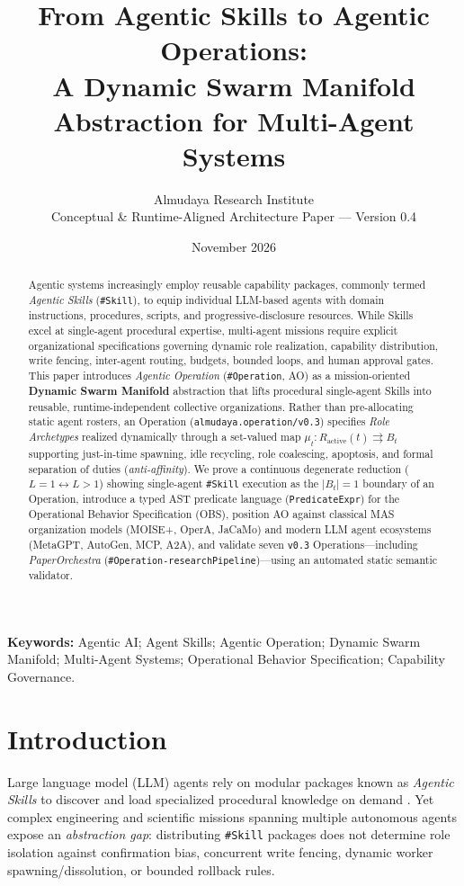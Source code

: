 \documentclass[11pt,a4paper]{article}
\title{\textbf{From Agentic Skills to Agentic Operations:\\
A Dynamic Swarm Manifold Abstraction for Multi-Agent Systems}}
\author{Almudaya Research Institute\\
\small Conceptual \& Runtime-Aligned Architecture Paper --- Version 0.4}
\date{November 2026}
\begin{document}
\maketitle

\begin{abstract}
Agentic systems increasingly employ reusable capability packages, commonly termed \emph{Agentic Skills} (\texttt{\#Skill}), to equip individual LLM-based agents with domain instructions, procedures, scripts, and progressive-disclosure resources. While Skills excel at single-agent procedural expertise, multi-agent missions require explicit organizational specifications governing dynamic role realization, capability distribution, write fencing, inter-agent routing, budgets, bounded loops, and human approval gates. This paper introduces \emph{Agentic Operation} (\texttt{\#Operation}, AO) as a mission-oriented \textbf{Dynamic Swarm Manifold} abstraction that lifts procedural single-agent Skills into reusable, runtime-independent collective organizations. Rather than pre-allocating static agent rosters, an Operation (\texttt{almudaya.operation/v0.3}) specifies \emph{Role Archetypes} realized dynamically through a set-valued map $\mu_t : R_{\mathrm{active}}(t) \rightrightarrows B_t$ supporting just-in-time spawning, idle recycling, role coalescing, apoptosis, and formal separation of duties (\emph{anti-affinity}). We prove a continuous degenerate reduction ($L=1 \leftrightarrow L>1$) showing single-agent \texttt{\#Skill} execution as the $|B_t|=1$ boundary of an Operation, introduce a typed AST predicate language (\texttt{PredicateExpr}) for the Operational Behavior Specification (OBS), position AO against classical MAS organization models (MOISE+, OperA, JaCaMo) and modern LLM agent ecosystems (MetaGPT, AutoGen, MCP, A2A), and validate seven \texttt{v0.3} Operations—including \emph{PaperOrchestra} (\texttt{\#Operation-researchPipeline})—using an automated static semantic validator.
\end{abstract}

\noindent\textbf{Keywords:} Agentic AI; Agent Skills; Agentic Operation; Dynamic Swarm Manifold; Multi-Agent Systems; Operational Behavior Specification; Capability Governance.

\section{Introduction}
Large language model (LLM) agents rely on modular packages known as \emph{Agentic Skills} to discover and load specialized procedural knowledge on demand \cite{anthropic2025skills}. Yet complex engineering and scientific missions spanning multiple autonomous agents expose an \emph{abstraction gap}: distributing \texttt{\#Skill} packages does not determine role isolation against confirmation bias, concurrent write fencing, dynamic worker spawning/dissolution, or bounded rollback rules.
\end{document}
